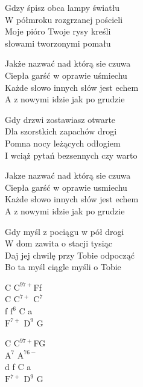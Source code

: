
\begin{textn}
    Gdzy śpisz obca lampy światłu\\
    W półmroku rozgrzanej pościeli\\
    Moje pióro Twoje rysy kreśli\\
    słowami tworzonymi pomału

    Jakże nazwać nad którą sie czuwa\\
    Ciepła garść w oprawie uśmiechu\\
    Każde słowo innych słów jest echem\\
    A z nowymi idzie jak po grudzie


    Gdy drzwi zostawiasz otwarte\\
    Dla szorstkich zapachów drogi\\
    Pomna nocy leżących odłogiem\\
    I wciąż pytań bezsennych czy warto

    Jakze nazwać nad którą sie czuwa\\
    Ciepła garść w oprawie usmiechu\\
    Każde słowo innych słów jest echem\\
    A z nowymi idzie jak po grudzie

    Gdy myśl z pociągu w pół drogi\\
    W dom zawita o stacji tysiąc\\
    Daj jej chwilę przy Tobie odpocząć\\
    Bo ta myśl ciągle myśli o Tobie
\end{textn}
\begin{chordw}
    C $\mathrm{C^{9 7+}}$Ff\\
    C $\mathrm{C^{7+}}$ $\mathrm{C^7}$\\
    f $\mathrm{f^6}$ C a\\
    $\mathrm{F^{7+}}$ $\mathrm{D^9}$ G

    C $\mathrm{C^{9 7+}}$FG\\
    $\mathrm{A^7}$ $\mathrm{A^{7 6-}}$\\
    d f C a\\
    $\mathrm{F^{7+}}$ $\mathrm{D^9}$ G
\end{chordw}
